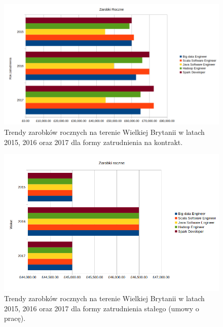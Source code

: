 \begin{figure}[h]
	\centering
	\includegraphics[scale=0.5]{salaries_contract.png}
	\caption{Trendy zarobków rocznych na terenie Wielkiej Brytanii w latach 2015, 2016 oraz 2017 dla formy zatrudnienia na kontrakt.}
	\label{fig:@=salaries_contract}
\end{figure}
\begin{figure}[h]
	\centering
	\includegraphics[scale=0.5]{salaries_permanent.png}
	\caption{Trendy zarobków rocznych na terenie Wielkiej Brytanii w latach 2015, 2016 oraz 2017 dla formy zatrudnienia stałego (umowy o pracę).}
	\label{fig:@=salaries_permanent}
\end{figure}
